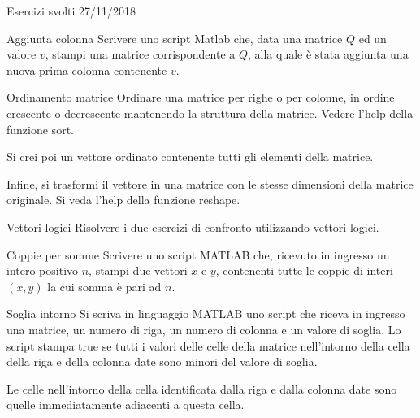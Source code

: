 \documentclass[format=169, handout]{beamer}
\begin{document}
\begin{frame}
\Huge
Esercizi svolti 27/11/2018
\end{frame}

\begin{frame}{Aggiunta colonna}
Scrivere uno script Matlab che, data una matrice $Q$ ed un valore $v$, stampi una
matrice corrispondente a $Q$, alla quale è stata aggiunta una nuova prima
colonna contenente $v$.
\end{frame}

\begin{frame}{Ordinamento matrice}
Ordinare una matrice per righe o per colonne, in ordine crescente o decrescente mantenendo la struttura della matrice. Vedere l'help della funzione sort.

Si crei poi un vettore ordinato contenente tutti gli elementi della matrice.

Infine, si trasformi il vettore in una matrice con le stesse dimensioni della matrice originale. Si veda l'help della funzione reshape.
\end{frame}

\begin{frame}{Vettori logici}
Risolvere i due esercizi di confronto utilizzando vettori logici.
\end{frame}

\begin{frame}{Coppie per somme}
Scrivere uno script MATLAB che, ricevuto in ingresso un intero positivo $n$, stampi due vettori $x$ e $y$, contenenti tutte le coppie di interi $(x,y)$ la cui somma è pari ad $n$.
\end{frame}

\begin{frame}{Soglia intorno}
Si scriva in linguaggio MATLAB uno script che riceva in ingresso una matrice, un numero di riga, un numero di colonna e un valore di soglia. Lo script stampa true se tutti i valori delle celle della matrice nell'intorno della cella della riga e della colonna date sono minori del valore di soglia.

Le celle nell'intorno della cella identificata dalla riga e dalla colonna date sono quelle immediatamente adiacenti a questa cella.
\end{frame}
\end{document}
